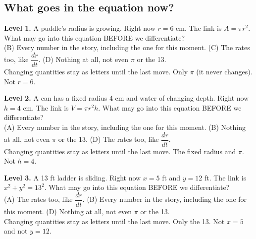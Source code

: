 \documentclass[11pt]{article}
\begin{document}
\subsection*{What goes in the equation now?}
\noindent\textbf{Level 1.} A puddle's radius is growing. Right now $r=6$ cm. The link is $A=\pi r^2$. What may go into this equation BEFORE we differentiate?\\  \quad (B) Every number in the story, including the one for this moment. \quad (C) The rates too, like $\dfrac{dr}{dt}$. \quad (D) Nothing at all, not even $\pi$ or the 13.\\  \quad Changing quantities stay as letters until the last move. Only $\pi$ (it never changes). Not $r=6$.\par\medskip
\noindent\textbf{Level 2.} A can has a fixed radius 4 cm and water of changing depth. Right now $h=4$ cm. The link is $V=\pi r^2h$. What may go into this equation BEFORE we differentiate?\\ (A) Every number in the story, including the one for this moment. \quad (B) Nothing at all, not even $\pi$ or the 13. \quad {} \quad (D) The rates too, like $\dfrac{dr}{dt}$.\\  \quad Changing quantities stay as letters until the last move. The fixed radius and $\pi$. Not $h=4$.\par\medskip
\noindent\textbf{Level 3.} A 13 ft ladder is sliding. Right now $x=5$ ft and $y=12$ ft. The link is $x^2+y^2=13^2$. What may go into this equation BEFORE we differentiate?\\ (A) The rates too, like $\dfrac{dr}{dt}$. \quad (B) Every number in the story, including the one for this moment. \quad {} \quad (D) Nothing at all, not even $\pi$ or the 13.\\  \quad Changing quantities stay as letters until the last move. Only the 13. Not $x=5$ and not $y=12$.\par\medskip
\end{document}
